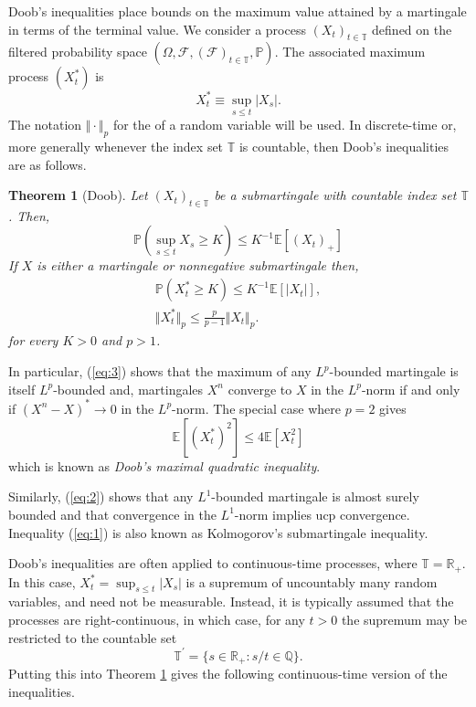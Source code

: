 \documentclass[12pt]{article}
\newtheorem{theorem}{Theorem}
\begin{document}

Doob's inequalities place bounds on the maximum value attained by a martingale in terms of the terminal value.
We consider a process $(X_t)_{t\in\mathbb{T}}$ defined on the filtered probability space $(\Omega,\mathcal{F},(\mathcal{F})_{t\in\mathbb{T}},\mathbb{P})$. The associated maximum process $(X^*_t)$ is
\begin{equation*}
X^*_t\equiv\sup_{s\le t}|X_s|.
\end{equation*}
The notation $\Vert \cdot\Vert_p$ for the  of a random variable will be used.
In discrete-time or, more generally whenever the index set $\mathbb{T}$ is countable, then Doob's inequalities are as follows.

\begin{theorem}[Doob]\label{thm:1}
Let $(X_t)_{t\in\mathbb{T}}$ be a submartingale with countable index set $\mathbb{T}$. Then,
\begin{equation}\label{eq:1}
\mathbb{P}\left(\sup_{s\le t}X_s\ge K\right)\le K^{-1}\mathbb{E}[(X_t)_+]
\end{equation}
If $X$ is either a martingale or nonnegative submartingale then,
\begin{gather}
\label{eq:2}\mathbb{P}(X^*_t\ge K)\le K^{-1}\mathbb{E}[|X_t|],\\
\label{eq:3}\Vert X^*_t\Vert_p\le \frac{p}{p-1}\Vert X_t\Vert_p. 
\end{gather}
for every $K>0$ and $p>1$.
\end{theorem}

In particular, (\ref{eq:3}) shows that the maximum of any $L^p$-bounded martingale is itself $L^p$-bounded and, martingales $X^n$ converge to $X$ in the $L^p$-norm if and only if $(X^n-X)^*\rightarrow 0$ in the $L^p$-norm. The special case where $p=2$ gives
\begin{equation*}
\mathbb{E}[(X^*_t)^2]\le 4\mathbb{E}[X_t^2]
\end{equation*}
which is known as \emph{Doob's maximal quadratic inequality}.

Similarly, (\ref{eq:2}) shows that any $L^1$-bounded martingale is almost surely bounded and that convergence in the $L^1$-norm implies ucp convergence. Inequality (\ref{eq:1}) is also known as Kolmogorov's submartingale inequality.

Doob's inequalities are often applied to continuous-time processes, where $\mathbb{T}=\mathbb{R}_+$. In this case, $X^*_t=\sup_{s\le t}|X_s|$ is a supremum of uncountably many random variables, and need not be measurable. Instead, it is typically assumed that the processes are right-continuous, in which case, for any $t>0$ the supremum may be restricted to the countable set
\begin{equation*}
\mathbb{T}^\prime=\{s\in\mathbb{R}_+:s/t\in\mathbb{Q}\}.
\end{equation*}
Putting this into Theorem \ref{thm:1} gives the following continuous-time version of the inequalities.
\end{document}
